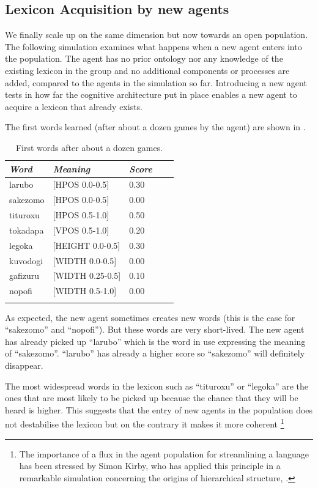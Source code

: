 \subsection{Lexicon Acquisition by new agents}

We finally scale up on the same dimension but 
now towards an open population. The following 
simulation examines what happens when a new agent 
enters into the population. The agent has no 
prior ontology nor any knowledge of the existing
lexicon in the group and no additional components
or processes are added, compared to the agents
in the simulation so far. Introducing a new 
agent tests in how far the cognitive architecture
put in place enables a new agent to acquire a 
lexicon that already exists. 

The first words learned (after about a dozen 
games by the agent) are shown in . 


\begin{table}
\begin{center}
\begin{tabular}{ l  l  l  l  l }
\lsptoprule
{\itshape Word} & {\itshape Meaning} & {\itshape Score} \\ \midrule
larubo  & [HPOS 0.0-0.5] & 0.30 \\ 
sakezomo &  [HPOS 0.0-0.5] & 0.00 \\ 
tituroxu &  [HPOS 0.5-1.0] & 0.50 \\ 
tokadapa & [VPOS 0.5-1.0] & 0.20 \\ 
legoka   & [HEIGHT 0.0-0.5] & 0.30 \\ 
kuvodogi  & [WIDTH 0.0-0.5] & 0.00 \\ 
gafizuru &  [WIDTH 0.25-0.5] & 0.10  \\ 
nopofi  & [WIDTH 0.5-1.0] & 0.00 \\ 
\lspbottomrule
\end{tabular}
\caption{\label{tab:first} First words after about a dozen games.}
\end{center}
\end{table}

As expected, the new 
agent sometimes creates new words (this is the case 
for ``sakezomo'' and ``nopofi''). But these words are 
very short-lived. The new agent has already picked up 
``larubo'' which is the word in use expressing the 
meaning of ``sakezomo''. ``larubo'' has already a higher 
score so ``sakezomo'' will definitely disappear. 

The most widespread words in the lexicon 
such as ``tituroxu'' or ``legoka'' are the ones that 
are most likely to be picked up because the chance
that they will be heard is higher. This suggests
that the entry of new agents in the population does
not destabilise the lexicon but on the contrary 
it makes it more coherent \footnote{The importance of a flux in the agent population for
streamlining a language has been stressed by Simon Kirby, who 
has applied this principle in a remarkable simulation 
concerning the origins of hierarchical structure, \cite{Kirby:1999}.}

